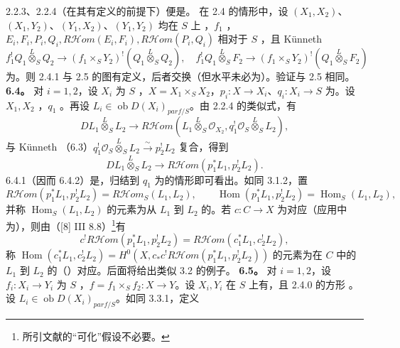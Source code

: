 2.2.3、2.2.4（在其有定义的前提下）便是。
在 2.4 的情形中，设 $(X_1,X_2)$、$(X_1,Y_2)$、$(Y_1,X_2)$、$(Y_1,Y_2)$ 均在 $S$ 上 ，$f_1$ ，$E_i,F_i,P_i,Q_i,R\mathcal Hom(E_i,F_i),R\mathcal Hom(P_i,Q_i)$ 相对于 $S$ ，且 Künneth 
\[f_1^!Q_1\mathbin{\overset L\otimes}_SQ_2\longrightarrow(f_1\times_SY_2)^!(Q_1\mathbin{\overset L\otimes}_SQ_2),\quad f_1^!Q_1\mathbin{\overset L\otimes}_SF_2\longrightarrow(f_1\times_SY_2)^!(Q_1\mathbin{\overset L\otimes}_SF_2)\]
为。则 2.4.1 与 2.5 的图有定义，后者交换（但水平未必为）。验证与 2.5 相同。
\textbf{6.4。} 对 $i=1,2$，设 $X_i$ 为 $S$ ，$X=X_1\times_SX_2$，$p_i:X\to X_i$、$q_i:X_i\to S$ 为。设 $X_1,X_2$ ，$q_1$ 。再设 $L_i\in\operatorname{ob}D(X_i)_{parf/S}$。由 2.2.4 的类似式，有
\[DL_1\mathbin{\overset L\otimes}_SL_2\longrightarrow R\mathcal Hom(L_1\mathbin{\overset L\otimes}_S\mathcal O_{X_2},q_1^!\mathcal O_S\mathbin{\overset L\otimes}_SL_2),\tag{6.4.1}\]
与 Künneth （6.3）$q_1^!\mathcal O_S\mathbin{\overset L\otimes}_SL_2\xrightarrow\sim p_2^!L_2$ 复合，得到
\[DL_1\mathbin{\overset L\otimes}_SL_2\longrightarrow R\mathcal Hom(p_1^*L_1,p_2^!L_2).\tag{6.4.2}\]
6.4.1（因而 6.4.2）是，归结到 $q_1$ 为的情形即可看出。如同 3.1.2，置
\[R\mathcal Hom(p_1^*L_1,p_2^!L_2)=R\mathcal Hom_S(L_1,L_2),\qquad\operatorname{Hom}(p_1^*L_1,p_2^!L_2)=\operatorname{Hom}_S(L_1,L_2),\tag{6.4.3}\]
并称 $\operatorname{Hom}_S(L_1,L_2)$ 的元素为从 $L_1$ 到 $L_2$ 的。若 $c:C\to X$ 为对应（应用中为），则由（[8] III 8.8）\footnote{所引文献的“可化”假设不必要。}有
\[c^!R\mathcal Hom(p_1^*L_1,p_2^!L_2)=R\mathcal Hom(c_1^*L_1,c_2^!L_2),\tag{6.4.4}\]
称 $\operatorname{Hom}(c_1^*L_1,c_2^!L_2)=H^0(X,c_*c^!R\mathcal Hom(p_1^*L_1,p_2^!L_2))$ 的元素为在 $C$ 中的 $L_1$ 到 $L_2$ 的（）对应。后面将给出类似 3.2 的例子。
\textbf{6.5。} 对 $i=1,2$，设 $f_i:X_i\to Y_i$ 为 $S$ ，$f=f_1\times_Sf_2:X\to Y$。设 $X_i,Y_i$ 在 $S$ 上有，且 2.4.0 的方形 。设 $L_i\in\operatorname{ob}D(X_i)_{parf/S}$。如同 3.3.1，定义

